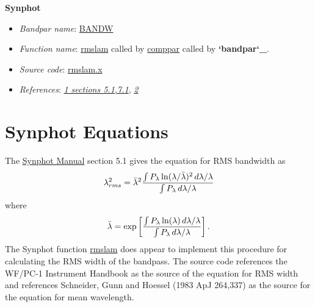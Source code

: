 \documentclass[letterpaper,10pt,english]{sphinxtsr}
\begin{document}
\textbf{Synphot}
\begin{itemize}
\item {} 
\emph{Bandpar name}: \href{https://svn.stsci.edu/trac/ssb/stsci\_python/browser/stsdas/trunk/stsdas/pkg/hst\_calib/synphot/doc/bandpar.hlp}{BANDW}

\item {} 
\emph{Function name}: \href{https://svn.stsci.edu/trac/ssb/stsci\_python/browser/stsdas/trunk/stsdas/lib/synphot/rmslam.x}{rmslam} called by \href{https://svn.stsci.edu/trac/ssb/stsci\_python/browser/stsdas/trunk/stsdas/pkg/hst\_calib/synphot/bandpar/comppar.x}{comppar} called by {\color{red}\bfseries{}{}`bandpar{}`\_}.

\item {} 
\emph{Source code}: \href{https://svn.stsci.edu/trac/ssb/stsci\_python/browser/stsdas/trunk/stsdas/lib/synphot/rmslam.x}{rmslam.x}

\item {} 
\emph{References}: {\hyperref[references:ref1]{\emph{1 sections 5.1,7.1}}}, {\hyperref[references:ref2]{\emph{2}}}

\end{itemize}


\section{Synphot Equations}
\label{main:synphot-equations}\label{main:id1}
The \href{http://stsdas.stsci.edu/stsci\_python\_epydoc/SynphotManual.pdf}{Synphot Manual} section 5.1 gives the equation for RMS bandwidth as
\begin{gather}
\begin{split}\lambda_{rms}^2 = \bar{\lambda}^2 \frac{\int P_{\lambda} \ln(\lambda/\bar{\lambda})^2
\,d\lambda/\lambda}{\int P_{\lambda} \,d\lambda/\lambda}\end{split}\notag
\end{gather}
where
\begin{gather}
\begin{split}\bar{\lambda} = \exp \left[ \frac{\int P_{\lambda} \ln(\lambda) \,d\lambda/\lambda}
{\int P_{\lambda} \,d\lambda/\lambda} \right].\end{split}\notag
\end{gather}
The Synphot function \href{https://svn.stsci.edu/trac/ssb/stsci\_python/browser/stsdas/trunk/stsdas/lib/synphot/rmslam.x}{rmslam} does appear to implement this procedure for
calculating the RMS width of the bandpass. The source code references the WF/PC-1
Instrument Handbook as the source of the equation for RMS width and references
Schneider, Gunn and Hoessel (1983 ApJ 264,337) as the source for the equation
for mean wavelength.
\end{document}
